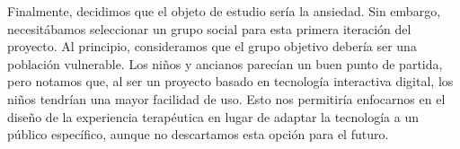 \begin{table}[h!]
	\centering
		\caption{Comparación de emociones limitantes contra sus respectivas potenciadoras.}
		\label{tab:Emotions}
\end{table}

Finalmente, decidimos que el objeto de estudio sería la ansiedad. Sin embargo, necesitábamos seleccionar un grupo social para esta primera iteración del proyecto. Al principio, consideramos que el grupo objetivo debería ser una población vulnerable. Los niños y ancianos parecían un buen punto de partida, pero notamos que, al ser un proyecto basado en tecnología interactiva digital, los niños tendrían una mayor facilidad de uso. Esto nos permitiría enfocarnos en el diseño de la experiencia terapéutica en lugar de adaptar la tecnología a un público específico, aunque no descartamos esta opción para el futuro. 

